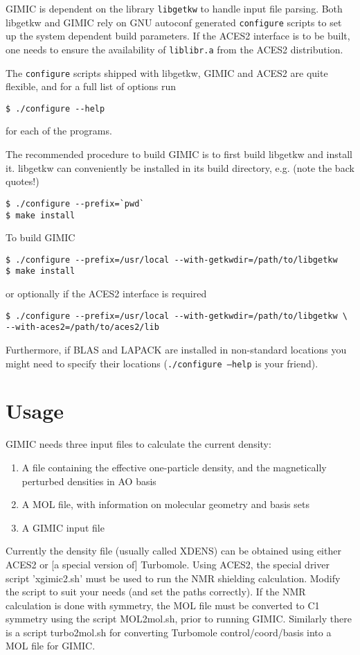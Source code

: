 \documentclass[a4paper,11pt]{article}
\begin{document}
GIMIC is dependent on the library {\tt libgetkw} to handle input file parsing.
Both libgetkw and GIMIC rely on GNU autoconf generated {\tt configure} scripts
to
set up the system dependent build parameters. If the ACES2 interface is to be
built, one needs to ensure the availability of {\tt liblibr.a} from the ACES2
distribution.

The \texttt{configure} scripts shipped with libgetkw, GIMIC and ACES2 are
quite flexible, and for a full list of options run
\begin{verbatim}
$ ./configure --help
\end{verbatim}
for each of the programs. 

The recommended procedure to build GIMIC is to first build libgetkw and
install it. libgetkw can conveniently be installed in its build directory,
e.g. (note the back quotes!)
\begin{verbatim}
$ ./configure --prefix=`pwd`
$ make install
\end{verbatim}

To build GIMIC
\begin{verbatim}
$ ./configure --prefix=/usr/local --with-getkwdir=/path/to/libgetkw 
$ make install
\end{verbatim}
or optionally if the ACES2 interface is required
\begin{verbatim}
$ ./configure --prefix=/usr/local --with-getkwdir=/path/to/libgetkw \
--with-aces2=/path/to/aces2/lib
\end{verbatim}
Furthermore, if BLAS and LAPACK are installed in non-standard locations you
might need to specify their locations (\texttt{./configure --help} is your
friend).

\section{Usage}
GIMIC needs three input files to calculate the current density:
\begin{enumerate}
  \item A file containing the effective one-particle density, and the
	magnetically perturbed densities in AO basis
  \item A MOL file, with information on molecular geometry and basis sets	
  \item A GIMIC input file
\end{enumerate}

Currently the density file (usually called XDENS) can be obtained using either 
ACES2 or [a special version of] Turbomole. Using ACES2, the special driver
script 'xgimic2.sh' must be used to run the NMR shielding calculation. Modify
the script to suit your needs (and set the paths correctly). If the NMR
calculation is done with symmetry, the MOL file must be converted to C1
symmetry using the script MOL2mol.sh, prior to running GIMIC. Similarly there
is a script turbo2mol.sh for converting Turbomole control/coord/basis into a
MOL file for GIMIC.
\end{document}
